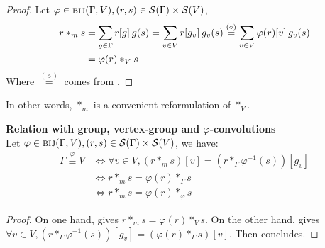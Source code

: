 \begin{proof}
Let $\varphi \in \bij(\Gamma, V),(r,s) \in \cs(\Gamma) \times \cs(V)$,
\begin{align*}
r \ast_m s & = \displaystyle \sum_{g \in \Gamma} r[g] \h{2} g(s)
  = \displaystyle \sum_{v \in V} r[g_v] \h{2} g_v(s)
  \overset{(\diamond)}{=} \displaystyle \sum_{v \in V} \varphi(r)[v] \h{2} g_v(s)\\
& =\varphi(r) \ast_{V} s
\end{align*}
Where $\overset{(\diamond)}{=}$ comes from .
\end{proof}

In other words, $\ast_m$ is a convenient reformulation of $\ast_{V}$.

\begin{lemma}\textbf{Relation with group, vertex-group and $\varphi$-convolutions}\\
Let $\varphi \in \bij(\Gamma, V),(r,s) \in \cs(\Gamma) \times \cs(V)$, we have:
\begin{align*}
\Gamma \overset{\varphi}{\equiv} V & \Leftrightarrow \forall v \in V, (r \ast_m s)[v] = (r \ast_{\Gamma} \varphi^{-1}(s))[g_v]\\
& \Leftrightarrow r \ast_m s = \varphi(r) \ast_{\Gamma} s\\
& \Leftrightarrow r \ast_m s = \varphi(r) \ast_{\varphi} s
\end{align*}
\label{lem:rel12m}
\end{lemma}

\begin{proof}
On one hand,  gives $r \ast_m s = \varphi(r) \ast_{V} s$. On the other hand,  gives $\forall v \in V,
(r \ast_{\Gamma} \varphi^{-1}(s))[g_v] = (\varphi(r) \ast_{\Gamma} s)[v]$. Then  concludes.
\end{proof}




